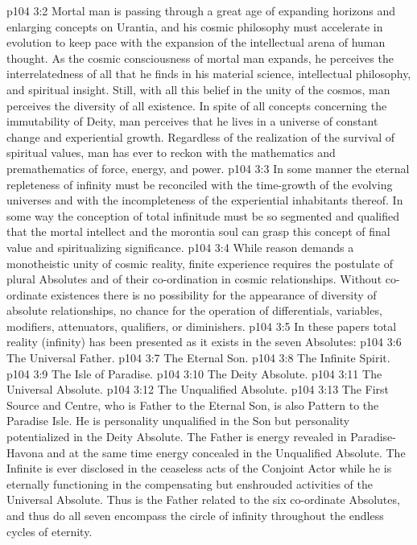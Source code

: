 \vs p104 3:2 Mortal man is passing through a great age of expanding horizons and enlarging concepts on Urantia, and his cosmic philosophy must accelerate in evolution to keep pace with the expansion of the intellectual arena of human thought. As the cosmic consciousness of mortal man expands, he perceives the interrelatedness of all that he finds in his material science, intellectual philosophy, and spiritual insight. Still, with all this belief in the unity of the cosmos, man perceives the diversity of all existence. In spite of all concepts concerning the immutability of Deity, man perceives that he lives in a universe of constant change and experiential growth. Regardless of the realization of the survival of spiritual values, man has ever to reckon with the mathematics and premathematics of force, energy, and power.
\vs p104 3:3 In some manner the eternal repleteness of infinity must be reconciled with the time\hyp{}growth of the evolving universes and with the incompleteness of the experiential inhabitants thereof. In some way the conception of total infinitude must be so segmented and qualified that the mortal intellect and the morontia soul can grasp this concept of final value and spiritualizing significance.
\vs p104 3:4 While reason demands a monotheistic unity of cosmic reality, finite experience requires the postulate of plural Absolutes and of their co\hyp{}ordination in cosmic relationships. Without co\hyp{}ordinate existences there is no possibility for the appearance of diversity of absolute relationships, no chance for the operation of differentials, variables, modifiers, attenuators, qualifiers, or diminishers.
\vs p104 3:5 \pc In these papers total reality (infinity) has been presented as it exists in the seven Absolutes:
\vs p104 3:6 \bibnobreakspace The Universal Father.
\vs p104 3:7 \bibnobreakspace The Eternal Son.
\vs p104 3:8 \bibnobreakspace The Infinite Spirit.
\vs p104 3:9 \bibnobreakspace The Isle of Paradise.
\vs p104 3:10 \bibnobreakspace The Deity Absolute.
\vs p104 3:11 \bibnobreakspace The Universal Absolute.
\vs p104 3:12 \bibnobreakspace The Unqualified Absolute.
\vs p104 3:13 \pc The First Source and Centre, who is Father to the Eternal Son, is also Pattern to the Paradise Isle. He is personality unqualified in the Son but personality potentialized in the Deity Absolute. The Father is energy revealed in Paradise\hyp{}Havona and at the same time energy concealed in the Unqualified Absolute. The Infinite is ever disclosed in the ceaseless acts of the Conjoint Actor while he is eternally functioning in the compensating but enshrouded activities of the Universal Absolute. Thus is the Father related to the six co\hyp{}ordinate Absolutes, and thus do all seven encompass the circle of infinity throughout the endless cycles of eternity.
